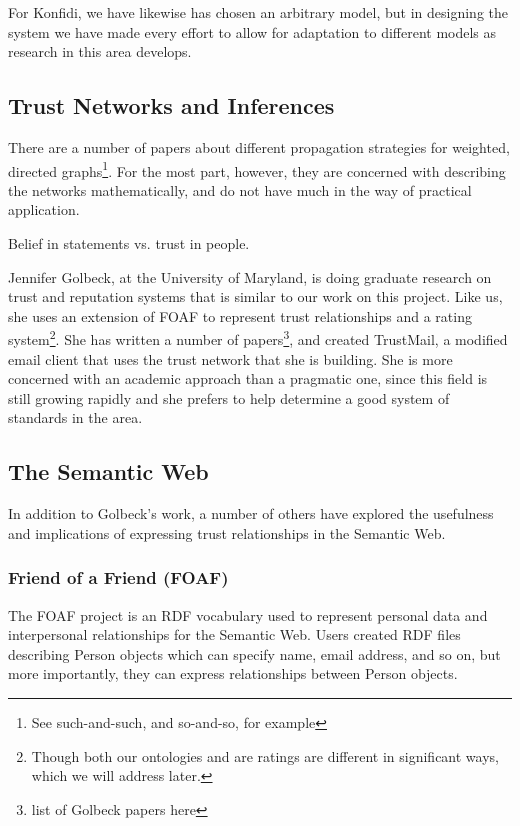 \documentclass{acm_proc_article-sp}
\begin{document}
For Konfidi, we have likewise has chosen an arbitrary model, but in designing the system we have made every effort to allow for adaptation to different models as research in this area develops. 

\subsection{Trust Networks and Inferences}
There are a number of papers about different propagation strategies for weighted, directed graphs\footnote{See such-and-such, and so-and-so, for example}.  For the most part, however, they are concerned with describing the networks mathematically, and do not have much in the way of practical application. 

Belief in statements vs. trust in people.

Jennifer Golbeck, at the University of Maryland, is doing graduate research on trust and reputation systems\cite{golbeckSite} that is similar to our work on this project.  Like us, she uses an extension of FOAF to represent trust relationships and a rating system\footnote{Though both our ontologies and are ratings are different in significant ways, which we will address later.}.  She has written a number of papers\footnote{list of Golbeck papers here}, and created TrustMail\cite{trustMail}, a modified email client that uses the trust network that she is building.  She is more concerned with an academic approach than a pragmatic one, since this field is still growing rapidly and she prefers to help determine a good system of standards in the area.

\subsection{The Semantic Web}
In addition to Golbeck's work, a number of others have explored the usefulness and implications of expressing trust relationships in the Semantic Web.

\subsubsection{Friend of a Friend (FOAF)}
\label{foaf}
The FOAF project\cite{foafProject} is an RDF vocabulary used to represent personal data and interpersonal relationships for the Semantic Web.  Users created RDF files describing Person objects which can specify name, email address, and so on, but more importantly, they can express relationships between Person objects.  
\end{document}

